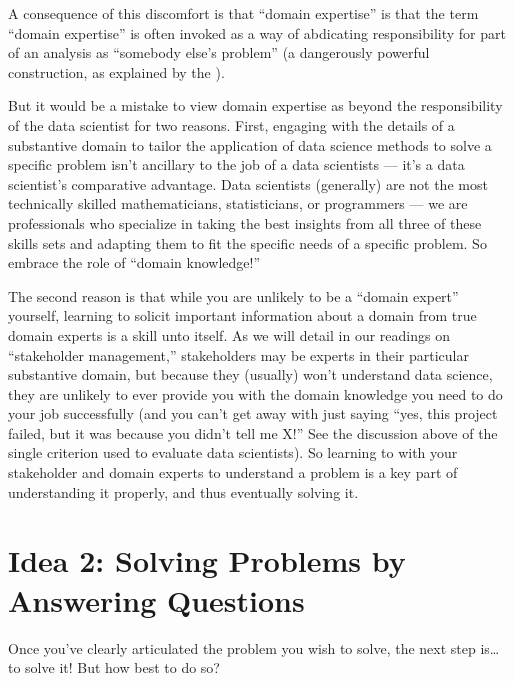 \documentclass[letterpaper,10pt,english]{jupyterBook}
\begin{document}
\sphinxAtStartPar
A consequence of this discomfort is that “domain expertise” is that the term “domain expertise” is often invoked as a way of abdicating responsibility for part of an analysis as “somebody else’s problem” (a dangerously powerful construction, as explained by the ).

\sphinxAtStartPar
But it would be a mistake to view domain expertise as beyond the responsibility of the data scientist for two reasons. First, engaging with the details of a substantive domain to tailor the application of data science methods to solve a specific problem isn’t ancillary to the job of a data scientists — it’s a data scientist’s comparative advantage. Data scientists (generally) are not the most technically skilled mathematicians, statisticians, or programmers — we are professionals who specialize in taking the best insights from all three of these skills sets and adapting them to fit the specific needs of a specific problem. So embrace the role of “domain knowledge!”

\sphinxAtStartPar
The second reason is that while you are unlikely to be a “domain expert” yourself, learning to solicit important information about a domain from true domain experts is a skill unto itself. As we will detail in our readings on “stakeholder management,” stakeholders may be experts in their particular substantive domain, but because they (usually) won’t understand data science, they are unlikely to ever provide you with the domain knowledge you need to do your job successfully (and you can’t get away with just saying “yes, this project failed, but it was because you didn’t tell me X!” See the discussion above of the single criterion used to evaluate data scientists). So learning to  with your stakeholder and domain experts to understand a problem is a key part of understanding it properly, and thus eventually solving it.

\sphinxstepscope


\section{Idea 2: Solving Problems by Answering Questions}
\label{\detokenize{10_introduction/22_question_types:idea-2-solving-problems-by-answering-questions}}\label{\detokenize{10_introduction/22_question_types::doc}}
\sphinxAtStartPar
Once you’ve clearly articulated the problem you wish to solve, the next step is… to solve it! But how best to do so?
\end{document}
